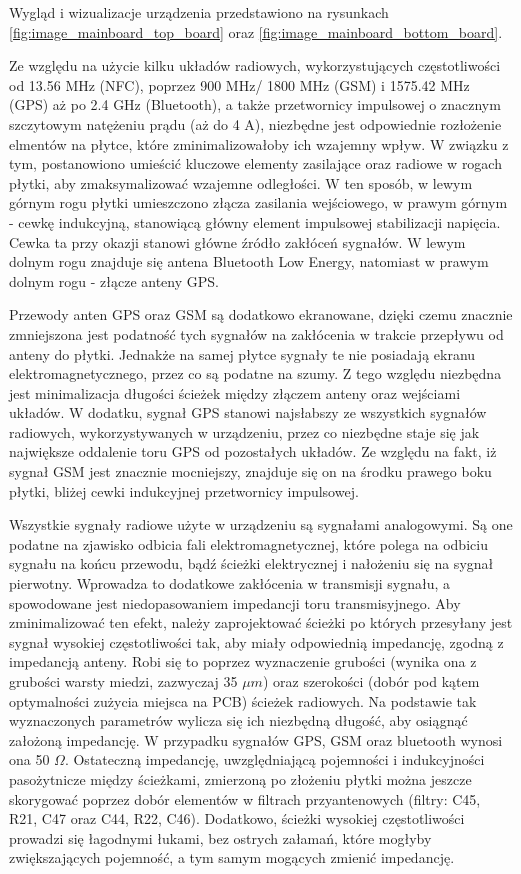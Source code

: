Wygląd i wizualizacje urządzenia przedstawiono na rysunkach \ref{fig:image_mainboard_top_board} oraz \ref{fig:image_mainboard_bottom_board}.

Ze względu na użycie kilku układów radiowych, wykorzystujących częstotliwości od 13.56 MHz (NFC), poprzez 900 MHz/ 1800 MHz (GSM) i 1575.42 MHz (GPS) aż po 2.4 GHz (Bluetooth), a także przetwornicy impulsowej o znacznym szczytowym natężeniu prądu (aż do 4 A), niezbędne jest odpowiednie rozłożenie elmentów na płytce, które zminimalizowałoby ich wzajemny wpływ. W związku z tym, postanowiono umieścić kluczowe elementy zasilające oraz radiowe w rogach płytki, aby zmaksymalizować wzajemne odległości. W ten sposób, w lewym górnym rogu płytki umieszczono złącza zasilania wejściowego, w prawym górnym - cewkę indukcyjną, stanowiącą główny element impulsowej stabilizacji napięcia. Cewka ta przy okazji stanowi główne źródło zakłóceń sygnałów. W lewym dolnym rogu znajduje się antena Bluetooth Low Energy, natomiast w prawym dolnym rogu - złącze anteny GPS. 

Przewody anten GPS oraz GSM są dodatkowo ekranowane, dzięki czemu znacznie zmniejszona jest podatność tych sygnałów na zakłócenia w trakcie przepływu od anteny do płytki. Jednakże na samej płytce sygnały te nie posiadają ekranu elektromagnetycznego, przez co są podatne na szumy. Z tego względu niezbędna jest minimalizacja długości ścieżek między złączem anteny oraz wejściami układów. W dodatku, sygnał GPS stanowi najsłabszy ze wszystkich sygnałów radiowych, wykorzystywanych w urządzeniu, przez co niezbędne staje się  jak największe oddalenie toru GPS od pozostałych układów. Ze względu na fakt, iż sygnał GSM jest znacznie mocniejszy, znajduje się on na środku prawego boku płytki, bliżej cewki indukcyjnej przetwornicy impulsowej. 

Wszystkie sygnały radiowe użyte w urządzeniu są sygnałami analogowymi. Są one podatne na zjawisko odbicia fali elektromagnetycznej, które polega na odbiciu sygnału na końcu przewodu, bądź ścieżki elektrycznej i nałożeniu się na sygnał pierwotny. Wprowadza to dodatkowe zakłócenia w transmisji sygnału, a spowodowane jest niedopasowaniem impedancji toru transmisyjnego. Aby zminimalizować ten efekt, należy zaprojektować ścieżki po których przesyłany jest sygnał wysokiej częstotliwości tak, aby miały odpowiednią impedancję, zgodną z impedancją anteny. Robi się to poprzez wyznaczenie grubości (wynika ona z grubości warsty miedzi, zazwyczaj 35 $\mu m$) oraz szerokości (dobór pod kątem optymalności zużycia miejsca na PCB) ścieżek radiowych. Na podstawie tak wyznaczonych parametrów wylicza się ich niezbędną długość, aby osiągnąć założoną impedancję. W przypadku sygnałów GPS, GSM oraz bluetooth wynosi ona 50 $\Omega$. Ostateczną impedancję, uwzględniającą pojemności i indukcyjności pasożytnicze między ścieżkami, zmierzoną po złożeniu płytki można jeszcze skorygować poprzez dobór elementów w filtrach przyantenowych (filtry: C45, R21, C47 oraz C44, R22, C46). Dodatkowo, ścieżki wysokiej częstotliwości prowadzi się łagodnymi łukami, bez ostrych załamań, które mogłyby zwiększających pojemność, a tym samym mogących zmienić impedancję. 

